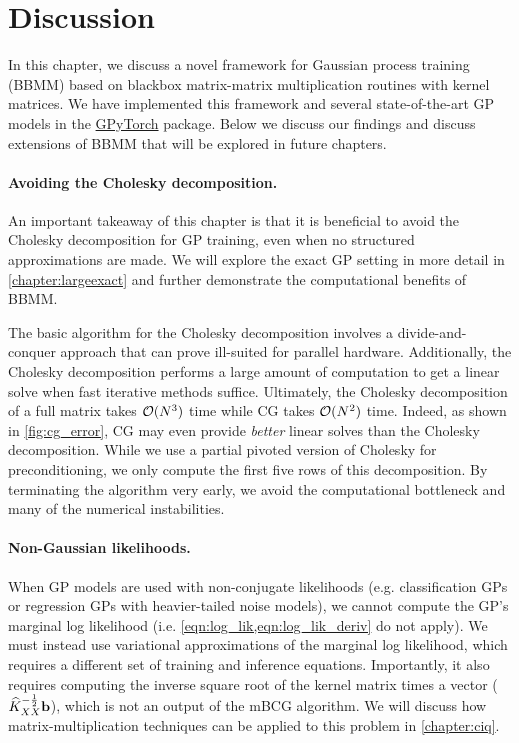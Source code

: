 \section{Discussion}
In this chapter, we discuss a novel framework for Gaussian process training (BBMM) based on blackbox matrix-matrix multiplication routines with kernel matrices.
We have implemented this framework and several state-of-the-art GP models in the {\href{https://gpytorch.ai}{GPyTorch}} package.
Below we discuss our findings and discuss extensions of BBMM that will be explored in future chapters.

\paragraph{Avoiding the Cholesky decomposition.}
An important takeaway of this chapter is that it is beneficial to avoid the Cholesky decomposition for GP training, even when no structured approximations are made.
We will explore the exact GP setting in more detail in \cref{chapter:largeexact} and further demonstrate the computational benefits of BBMM.

The basic algorithm for the Cholesky decomposition involves a divide-and-conquer approach that can prove ill-suited for parallel hardware.
Additionally, the Cholesky decomposition performs a large amount of computation to get a linear solve when fast iterative methods suffice.
Ultimately, the Cholesky decomposition of a full matrix takes $\bigo{N^3}$ time while CG takes $\bigo{N^2}$ time.
Indeed, as shown in \cref{fig:cg_error}, CG may even provide \emph{better} linear solves than the Cholesky decomposition.
While we use a partial pivoted version of Cholesky for preconditioning, we only compute the first five rows of this decomposition.
By terminating the algorithm very early, we avoid the computational bottleneck and many of the numerical instabilities.

\paragraph{Non-Gaussian likelihoods.}
When GP models are used with non-conjugate likelihoods (e.g. classification GPs or regression GPs with heavier-tailed noise models), we cannot compute the GP's marginal log likelihood (i.e. \cref{eqn:log_lik,eqn:log_lik_deriv} do not apply).
We must instead use variational approximations of the marginal log likelihood, which requires a different set of training and inference equations.
Importantly, it also requires computing the inverse square root of the kernel matrix times a vector ($\widehat{K}_{XX}^{- \frac 1 2} \mathbf{b}$), which is not an output of the mBCG algorithm.
We will discuss how matrix-multiplication techniques can be applied to this problem in \cref{chapter:ciq}.

